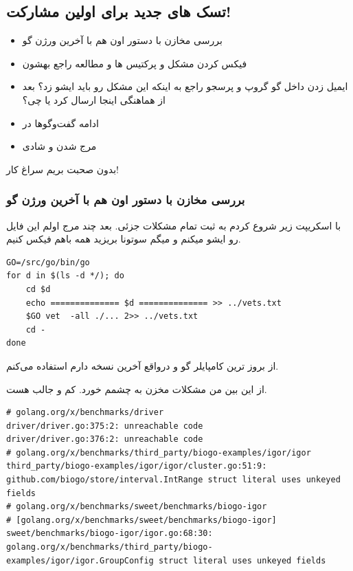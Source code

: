\subsection{تسک های جدید برای اولین مشارکت!}

\begin{itemize}
\item
بررسی مخازن با دستور  اون هم با آخرین ورژن گو
\item
فیکس کردن مشکل و پرکتیس ها و مطالعه راجع بهشون
\item
ایمیل زدن داخل گو گروپ و پرسجو راجع به اینکه این مشکل رو باید ایشو زد؟ بعد از هماهنگی اینجا \cl ارسال کرد یا چی؟
\item
ادامه گفت‌وگوها در 
\item
مرج شدن و شادی
\end{itemize}

بدون صحبت بریم سراغ کار!

\subsubsection{بررسی مخازن با دستور  اون هم با آخرین ورژن گو}
با اسکریپت زیر شروع کردم به ثبت تمام مشکلات جزئی. بعد چند مرج اولم این فایل رو ایشو میکنم و میگم سوتونا بریزید همه باهم فیکس کنیم.

\begin{latin}
\begin{verbatim}
GO=/src/go/bin/go
for d in $(ls -d */); do
    cd $d
    echo ============== $d ============== >> ../vets.txt
    $GO vet  -all ./... 2>> ../vets.txt
    cd -
done
\end{verbatim}
\end{latin}

از بروز ترین کامپایلر گو و درواقع آخرین نسخه دارم استفاده می‌کنم.

از این بین من مشکلات مخزن  به چشمم خورد. کم و جالب هست.

\begin{latin}
\begin{verbatim}
# golang.org/x/benchmarks/driver
driver/driver.go:375:2: unreachable code
driver/driver.go:376:2: unreachable code
# golang.org/x/benchmarks/third_party/biogo-examples/igor/igor
third_party/biogo-examples/igor/igor/cluster.go:51:9: github.com/biogo/store/interval.IntRange struct literal uses unkeyed fields
# golang.org/x/benchmarks/sweet/benchmarks/biogo-igor
# [golang.org/x/benchmarks/sweet/benchmarks/biogo-igor]
sweet/benchmarks/biogo-igor/igor.go:68:30: golang.org/x/benchmarks/third_party/biogo-examples/igor/igor.GroupConfig struct literal uses unkeyed fields
\end{verbatim}
\end{latin}


